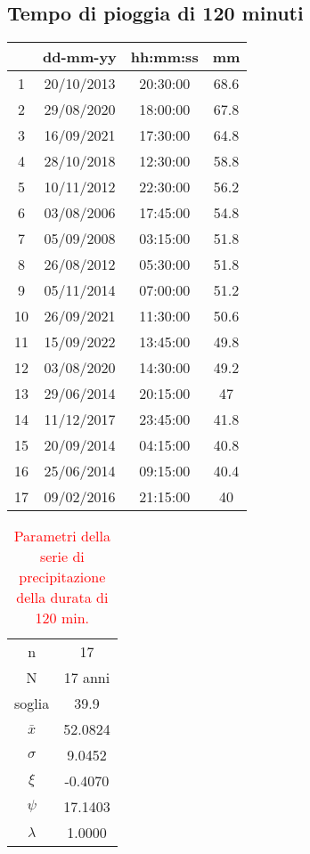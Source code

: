 \subsection{Tempo di pioggia di 120 minuti}
\begin{table}[H] \centering
        \begin{tabular}{cccc}
        \toprule
           & dd-mm-yy   & hh:mm:ss & mm \\
        \midrule
        1  & 20/10/2013 & 20:30:00 & 68.6 \\
        2  & 29/08/2020 & 18:00:00 & 67.8 \\
        3  & 16/09/2021 & 17:30:00 & 64.8 \\
        4  & 28/10/2018 & 12:30:00 & 58.8 \\
        5  & 10/11/2012 & 22:30:00 & 56.2 \\
        6  & 03/08/2006 & 17:45:00 & 54.8 \\
        7  & 05/09/2008 & 03:15:00 & 51.8 \\
        8  & 26/08/2012 & 05:30:00 & 51.8 \\
        9  & 05/11/2014 & 07:00:00 & 51.2 \\
        10 & 26/09/2021 & 11:30:00 & 50.6 \\
        11 & 15/09/2022 & 13:45:00 & 49.8 \\
        12 & 03/08/2020 & 14:30:00 & 49.2 \\
        13 & 29/06/2014 & 20:15:00 & 47   \\
        14 & 11/12/2017 & 23:45:00 & 41.8 \\
        15 & 20/09/2014 & 04:15:00 & 40.8 \\
        16 & 25/06/2014 & 09:15:00 & 40.4 \\
        17 & 09/02/2016 & 21:15:00 & 40   \\
        \bottomrule
        \end{tabular}
\end{table}

\begin{table}[H] \centering
    \caption{\textcolor{red}{Parametri della serie di precipitazione della durata di 120 min.}}
    \begin{tabular}{cc}
        \toprule
    n        &     17    \\
    N        & 17 anni \\
    soglia   &     39.9    \\
    $\bar{x}$ &   52.0824     \\
    $\sigma$ &     9.0452    \\
    $\xi$      &     -0.4070  \\
    $\psi$      &   17.1403  \\
    $\lambda$   &   1.0000 \\
\bottomrule    
\end{tabular}
    \end{table}

